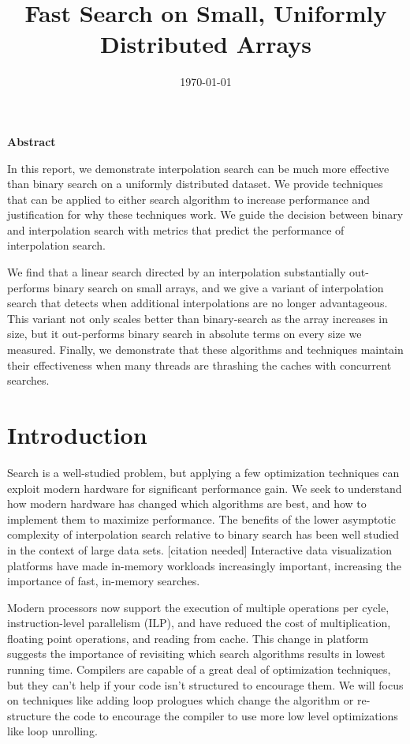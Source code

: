 \documentclass[twocolumn]{article}
\title{Fast Search on Small, Uniformly Distributed Arrays}
\date{\today}
\begin{document}


\begin{center}
\textbf{Abstract}
\end{center}

In this report, we demonstrate interpolation search can be much more effective than binary search on a uniformly distributed dataset. We provide techniques that can be applied to either search algorithm to increase performance and justification for why these techniques work. We guide the decision between binary and interpolation search with metrics that predict the performance of interpolation search.

We find that a linear search directed by an interpolation substantially out-performs binary search on small arrays, and we give a variant of interpolation search that detects when additional interpolations are no longer advantageous. This variant not only scales better than binary-search as the array increases in size, but it out-performs binary search in absolute terms on every size we measured. Finally, we demonstrate that these algorithms and techniques maintain their effectiveness when many threads are thrashing the caches with concurrent searches.

\section{Introduction}

Search is a well-studied problem, but applying a few optimization techniques can exploit modern hardware for significant performance gain. We seek to understand how modern hardware has changed which algorithms are best, and how to implement them to maximize performance. The benefits of the lower asymptotic complexity of interpolation search relative to binary search has been well studied in the context of large data sets. [citation needed] Interactive data visualization platforms have made in-memory workloads increasingly important, increasing the importance of fast, in-memory searches.

Modern processors now support the execution of multiple operations per cycle, instruction-level parallelism (ILP), and have reduced the cost of multiplication, floating point operations, and reading from cache. This change in platform suggests the importance of revisiting which search algorithms results in lowest running time. Compilers are capable of a great deal of optimization techniques, but they can't help if your code isn't structured to encourage them. We will focus on techniques like adding loop prologues which change the algorithm or re-structure the code to encourage the compiler to use more low level optimizations like loop unrolling.
\end{document}
